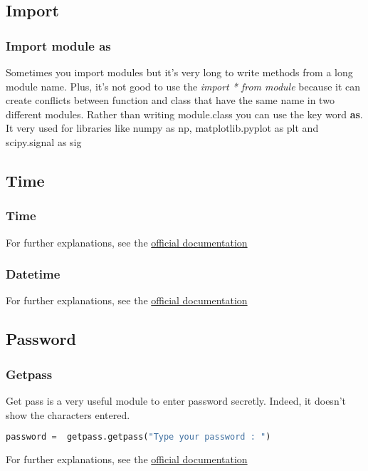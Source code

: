 \documentclass[a4paper, 12pt, titlepage]{scrartcl} %
\begin{document}
\subsection{Import}
\label{subsec:Import}

\subsubsection{Import module as}
\label{As}
Sometimes you import modules but it's very long to write methods from a long module name. Plus, it's not good to use the \textit{import * from module} because it can create conflicts between function and class that have the same name in two different modules. Rather than writing module.class you can use the key word \textbf{as}. It very used for libraries like numpy as np, matplotlib.pyplot as plt and scipy.signal as sig


\subsection{Time}
\subsubsection{Time}
For further explanations, see the \href{https://docs.python.org/3/library/time.html}{official documentation}

\subsubsection{Datetime}
For further explanations, see the \href{https://docs.python.org/3/library/datetime.html}{official documentation}

\subsection{Password}
\subsubsection{Getpass}
Get pass is a very useful module to enter password secretly. Indeed, it doesn't show the characters entered.
\begin{lstlisting}[language=Python]
password =  getpass.getpass("Type your password : ")
\end{lstlisting} \vspace{5mm}

For further explanations, see the \href{https://docs.python.org/3/library/getpass.html}{official documentation}
\end{document}
